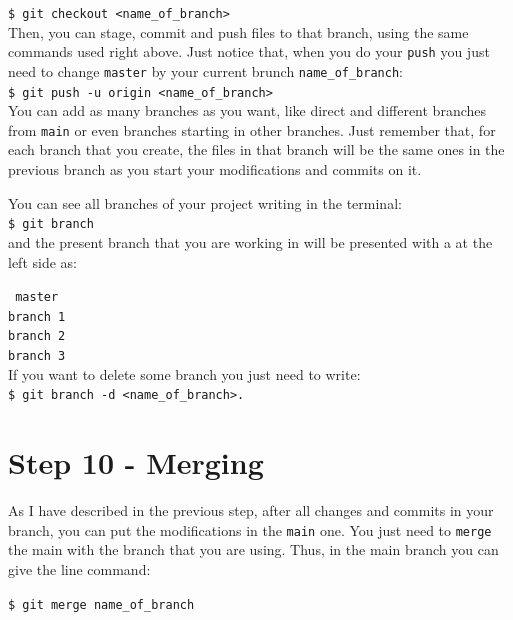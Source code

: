 \documentclass[12pt,a4paper,titlepage,brazil]{article}
\begin{document}
{\texttt{\$ git checkout <name\_of\_branch>}\\

Then, you can stage, commit and push files to that branch, using the same commands used right above. Just notice that, when you do your \texttt{push} you just need to change \texttt{master} by your current brunch \texttt{name\_of\_branch}:\\

\texttt{\$ git push -u origin <name\_of\_branch>}\\

You can add as many branches as you want, like direct and different branches from \texttt{main} or even branches starting in other branches. Just remember that, for each branch that you create, the files in that branch will be the same ones in the previous branch as you start your modifications and commits on it.

You can see all branches of your project writing in the terminal:\\

\texttt{\$ git branch}\\

and the present branch that you are working in will be presented with a \* at the left side as:

\texttt{\* master}\\

\texttt{branch 1}\\

\texttt{branch 2}\\

\texttt{branch 3}\\

If you want to delete some branch you just need to write:\\

\texttt{\$ git branch -d <name\_of\_branch>.}


\section{Step 10 - Merging}

As I have described in the previous step, after all changes and commits in your branch, you can put the modifications in the \texttt{main} one. You just need to \texttt{merge} the main with the branch that you are using. Thus, in the main branch you can give the line command:

\texttt{\$ git merge name\_of\_branch}

}
\end{document}
